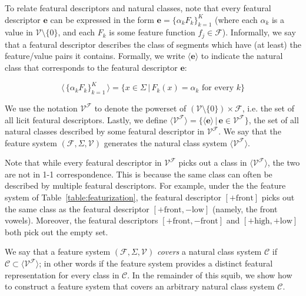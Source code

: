 \documentclass[11pt, oneside]{article}   	%
\begin{document}
To relate featural descriptors and natural classes, note that every featural descriptor $\mathbf{e}$ can be expressed in the form $\mathbf{e} = \{\alpha_k F_k\}_{k=1}^K$ (where each $\alpha_k$ is a value in $\mathcal V \setminus \{ 0 \}$, and each $F_k$ is some feature function $f_j \in \mathcal F$). Informally, we say that a featural descriptor describes the class of segments which have (at least) the feature/value pairs it contains. Formally, we write $\langle \mathbf{e} \rangle$ to indicate the natural class that corresponds to the featural descriptor $\mathbf{e}$:

$$ \langle \, \{\alpha_k F_k\}_{k=1}^K \, \rangle = \{x \in \Sigma \, | \, F_k(x) = \alpha_k \text{ for every } k \} $$

\vspace{\baselineskip} \noindent We use the notation $\mathcal V^\mathcal F$ to denote the powerset of $(\mathcal V \setminus \{0\}) \times \mathcal F$, i.e. the set of all licit featural descriptors. Lastly, we define $\langle \mathcal V^\mathcal F \rangle = \{ \langle \mathbf{e} \rangle \, | \, \mathbf{e} \in \mathcal V^\mathcal F \}$, the set of all natural classes described by some featural descriptor in $\mathcal V^\mathcal F$. We say that the feature system $(\mathcal F, \Sigma, \mathcal V)$ generates the natural class system $\langle \mathcal V^\mathcal F \rangle$.

Note that while every featural descriptor in $\mathcal V^\mathcal F$ picks out a class in $\langle \mathcal V^\mathcal F \rangle$, the two are not in 1-1 correspondence. This is because the same class can often be described by multiple featural descriptors. For example, under the the feature system of Table~\ref{table:featurization}, the featural descriptor $[+\text{front}]$ picks out the same class as the featural descriptor $[+ \text{front}, - \text{low}]$ (namely, the front vowels). Moreover, the featural descriptors $[+\text{front}, -\text{front}]$ and $[+\text{high}, +\text{low}]$ both pick out the empty set.

\vspace{\baselineskip} We say that a feature system $(\mathcal F, \Sigma, \mathcal V)$ \textit{covers} a natural class system $\mathcal C$ if $\mathcal C \subset \langle \mathcal V^\mathcal F \rangle$; in other words if the feature system provides a distinct featural representation for every class in $\mathcal C$. In the remainder of this squib, we show how to construct a feature system that covers an arbitrary natural class system $\mathcal C$.
\end{document}
